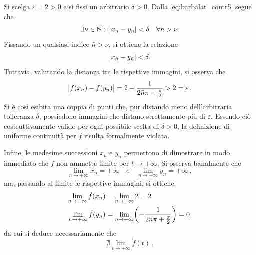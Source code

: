 \documentclass[a4paper,12pt]{article}
\begin{document}
\begin{example}
Si scelga $\varepsilon = 2 > 0$ e si fissi un arbitrario $\delta > 0$. 
Dalla \eqref{eq:barbalat_contr5} segue che
\begin{equation*}
    \exists \nu \in \mathbb{N} \, \colon \, \mleft| x_n - y_n \mright| < \delta \quad \forall n > \nu.
\end{equation*}
Fissando un qualsiasi indice $\bar{n} > \nu$, si ottiene la relazione
\begin{equation*}
    \mleft| x_{\bar{n}} - y_{\bar{n}} \mright| < \delta.
\end{equation*}
Tuttavia, valutando la distanza tra le rispettive immagini, si osserva che
\begin{equation*}
    \mleft| \dot{f}(x_{\bar{n}}) - \dot{f}(y_{\bar{n}}) \mright| = 2 + \frac{1}{2\bar{n}\pi + \frac{\pi}{2}} > 2 = \varepsilon \,.
\end{equation*}
Si è così esibita una coppia di punti che, pur distando meno dell'arbitraria tolleranza $\delta$, possiedono immagini che distano strettamente più di $\varepsilon$. Essendo ciò costruttivamente valido per ogni possibile scelta di $\delta > 0$, la definizione di uniforme continuità per $\dot{f}$ risulta formalmente violata.

\smallskip
Infine, le medesime successioni $x_n$ e $y_n$ permettono di dimostrare in modo immediato che $\dot{f}$ non ammette limite per $t \to +\infty$. Si osserva banalmente che
\begin{equation*}
    \lim_{n \to +\infty} x_n = +\infty \quad \text{e} \quad \lim_{n \to +\infty} y_n = +\infty \,,
\end{equation*}
ma, passando al limite le rispettive immagini, si ottiene:
\begin{align*}
    \lim_{n \to +\infty} \dot{f}(x_n) &= \lim_{n \to +\infty} 2 = 2 \\
    \lim_{n \to +\infty} \dot{f}(y_n) &= \lim_{n \to +\infty} \mleft( - \frac{1}{2n\pi + \frac{\pi}{2}} \mright) = 0 \,
\end{align*}
da cui si deduce necessariamente che
\begin{equation*}
    \nexists \lim_{t \to +\infty} \dot{f}(t) \,.
\end{equation*}
\end{example}
\end{document}
